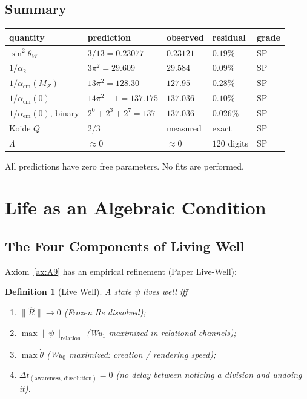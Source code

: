\documentclass[11pt, a4paper]{article}
\newtheorem{definition}{Definition}
\newcommand{\Reop}{\hat{R}}
\newcommand{\norm}[1]{\lVert #1 \rVert}
\begin{document}
\subsection{Summary}

\begin{center}
\begin{tabular}{@{}lllll@{}}
\toprule
quantity & prediction & observed & residual & grade \\
\midrule
$\sin^2\theta_W$ & $3/13 = 0.23077$ & $0.23121$ & $0.19\%$ & SP \\
$1/\alpha_2$ & $3\pi^2 = 29.609$ & $29.584$ & $0.09\%$ & SP \\
$1/\alpha_{\mathrm{em}}(M_Z)$ & $13\pi^2 = 128.30$ & $127.95$ & $0.28\%$ & SP \\
$1/\alpha_{\mathrm{em}}(0)$ & $14\pi^2-1 = 137.175$ & $137.036$ & $0.10\%$ & SP \\
$1/\alpha_{\mathrm{em}}(0)$, binary & $2^0+2^3+2^7 = 137$ & $137.036$ & $0.026\%$ & SP \\
Koide $Q$ & $2/3$ & measured & exact & SP \\
$\Lambda$ & $\approx 0$ & $\approx 0$ & $120$ digits & SP \\
\bottomrule
\end{tabular}
\end{center}

All predictions have zero free parameters. No fits are performed.


\section{Life as an Algebraic Condition}
\label{sec:live_well}

\subsection{The Four Components of Living Well}

Axiom~\ref{ax:A9} has an empirical refinement (Paper Live-Well):

\begin{definition}[Live Well]
\label{def:live_well}
A state $\psi$ \emph{lives well} iff
\begin{enumerate}[nosep]
\item $\norm{\Reop} \to 0$ (Frozen Re dissolved);
\item $\max \norm{\psi}_{\text{relation}}$ (Wu$_1$ maximized in
relational channels);
\item $\max \dot\theta$ (Wu$_0$ maximized: creation / rendering speed);
\item $\Delta t_{(\text{awareness, dissolution})} = 0$ (no delay
between noticing a division and undoing it).
\end{enumerate}
\end{definition}
\end{document}
